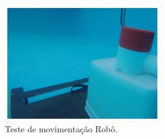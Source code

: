 \par
\begin{figure}[h]
  \centering
  \includegraphics[width=0.6\textwidth]{figures/test.png}
  \caption{Teste de movimentação Robô.}
  \label{fig:test}
\end{figure}
\par
